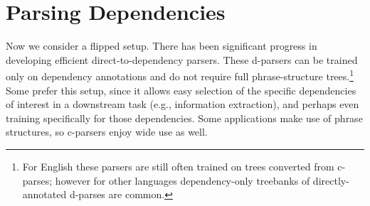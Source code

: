\documentclass[11pt,letterpaper]{article}
\newcommand{\Left}[1]{#1_{\Leftarrow}}
\newcommand{\Right}[1]{#1_{\Rightarrow}}
\newcommand{\Span}[1]{\langle #1 \rangle}
\begin{document}







\section{Parsing Dependencies}
\label{sec:pardeps}

Now we consider a flipped setup. There has been significant
progress in developing efficient direct-to-dependency parsers. These
d-parsers can be trained only on dependency annotations and do not
require full phrase-structure trees.\footnote{For English these
  parsers are still often trained on trees converted from c-parses;
  however for other languages dependency-only treebanks of
  directly-annotated d-parses are common.}  
Some prefer this setup, since it allows easy selection of the specific
dependencies of interest in a downstream task (e.g., information
extraction), and perhaps even training specifically for those
dependencies.  Some applications make use of phrase structures, so
c-parsers enjoy wide use as well.
\end{document}
